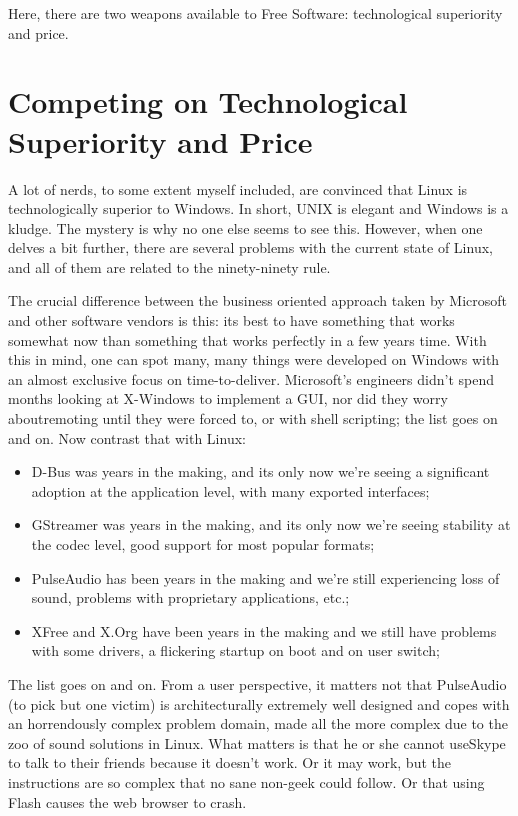 \documentclass{book}
\begin{document}
Here, there are two weapons available to Free Software: technological
superiority and price.

\section{Competing on Technological Superiority and Price}

A lot of nerds, to some extent myself included, are convinced that
Linux is technologically superior to Windows. In short, UNIX is
elegant and Windows is a kludge. The mystery is why no one else seems
to see this. However, when one delves a bit further, there are several
problems with the current state of Linux, and all of them are related
to the ninety-ninety rule.

The crucial difference between the business oriented approach taken by
Microsoft and other software vendors is this: its best to have
something that works somewhat now than something that works perfectly
in a few years time. With this in mind, one can spot many, many things
were developed on Windows with an almost exclusive focus on
time-to-deliver. Microsoft's engineers didn't spend months looking at
X-Windows to implement a GUI, nor did they worry aboutremoting until
they were forced to, or with shell scripting; the list goes on and
on. Now contrast that with Linux:

\begin{itemize}
\item D-Bus was years in the making, and its only now we're seeing a
  significant adoption at the application level, with many exported
  interfaces;
\item GStreamer was years in the making, and its only now we're seeing
  stability at the codec level, good support for most popular formats;
\item PulseAudio has been years in the making and we're still
  experiencing loss of sound, problems with proprietary applications,
  etc.;
\item XFree and X.Org have been years in the making and we still have
  problems with some drivers, a flickering startup on boot and on user
  switch;
\end{itemize}

The list goes on and on. From a user perspective, it matters not that
PulseAudio (to pick but one victim) is architecturally extremely well
designed and copes with an horrendously complex problem domain, made
all the more complex due to the zoo of sound solutions in Linux. What
matters is that he or she cannot useSkype to talk to their friends
because it doesn't work. Or it may work, but the instructions are so
complex that no sane non-geek could follow. Or that using Flash causes
the web browser to crash.
\end{document}
